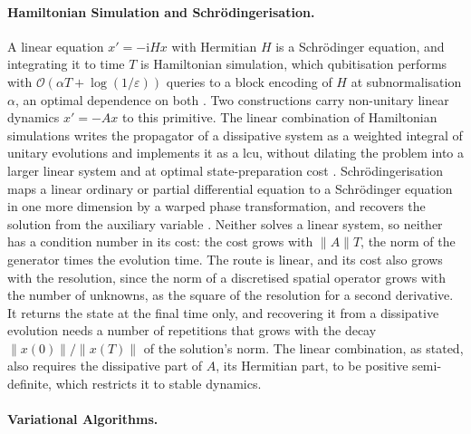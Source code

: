 \paragraph{Hamiltonian Simulation and Schrödingerisation.}
\label{sec:bg-de-hamsim}

A linear equation $x'=-\mathrm{i}Hx$ with Hermitian $H$ is a Schrödinger equation, and integrating it to time $T$ is Hamiltonian simulation, which qubitisation performs with $\mathcal O(\alpha T+\log(1/\varepsilon))$ queries to a block encoding of $H$ at subnormalisation $\alpha$, an optimal dependence on both \cite{lowchuang2017qsp,lowchuang2019qubitization}. Two constructions carry non-unitary linear dynamics $x'=-Ax$ to this primitive. The linear combination of Hamiltonian simulations writes the propagator of a dissipative system as a weighted integral of unitary evolutions and implements it as a \gls{lcu}, without dilating the problem into a larger linear system and at optimal state-preparation cost \cite{anliulin2023lchs}. Schrödingerisation maps a linear ordinary or partial differential equation to a Schrödinger equation in one more dimension by a warped phase transformation, and recovers the solution from the auxiliary variable \cite{jinliuyu2023schrodingerisation}. Neither solves a linear system, so neither has a condition number in its cost: the cost grows with $\|A\|T$, the norm of the generator times the evolution time. The route is linear, and its cost also grows with the resolution, since the norm of a discretised spatial operator grows with the number of unknowns, as the square of the resolution for a second derivative. It returns the state at the final time only, and recovering it from a dissipative evolution needs a number of repetitions that grows with the decay $\|x(0)\|/\|x(T)\|$ of the solution's norm. The linear combination, as stated, also requires the dissipative part of $A$, its Hermitian part, to be positive semi-definite, which restricts it to stable dynamics.

\paragraph{Variational Algorithms.}
\label{sec:bg-de-variational}

